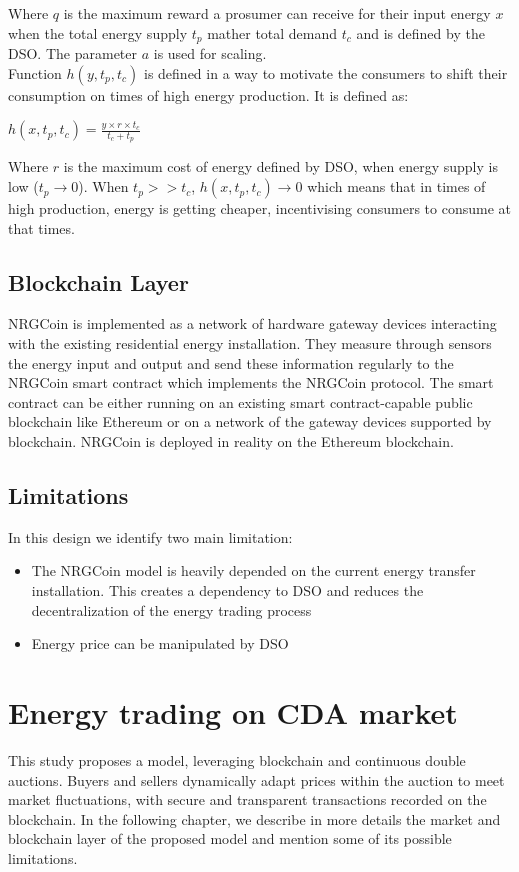 Where $q$ is the maximum reward a prosumer can receive for their input energy $x$ when the total energy supply $t_p$ mather total demand $t_c$ and is defined by the DSO.
The parameter $a$ is used for scaling.\\
Function $h(y,t_p,t_c)$ is defined in a way to motivate the consumers to shift their consumption on times of high energy production. It is defined as:
\begin{center}
    \begin{math}
        h(x,t_p,t_c) = \frac{y \times r \times t_c}{t_c+t_p}
    \end{math}
\end{center}
Where $r$ is the maximum cost of energy defined by DSO, when energy supply is low ($t_p\rightarrow0$).
When $t_p >> t_c$, $h(x,t_p,t_c)\rightarrow0$ which means that in times of high production, energy is getting cheaper, incentivising consumers to consume at that times.

\subsection{Blockchain Layer}

NRGCoin is implemented as a network of hardware gateway devices interacting with the existing residential energy installation. They measure through sensors the energy
input and output and send these information regularly to the NRGCoin smart contract which implements the NRGCoin protocol. The smart contract can be either running on an
existing smart contract-capable public blockchain like Ethereum or on a network of the gateway devices supported by blockchain.
NRGCoin is deployed in reality on the Ethereum blockchain.
\cite{NRGCoin2}

\subsection{Limitations}
In this design we identify two main limitation:
\begin{itemize}
    \item The NRGCoin model is heavily depended on the current energy transfer installation. This creates a dependency to DSO and reduces the decentralization of the energy trading process
    \item Energy price can be manipulated by DSO
\end{itemize}

\section{Energy trading on CDA market}
\label{sec:cda}
This study proposes a model, leveraging blockchain and continuous double auctions. Buyers and sellers dynamically adapt prices within the auction to meet market fluctuations, with secure and 
transparent transactions recorded on the blockchain. In the following chapter, we describe in more details the market and blockchain layer of the proposed model and mention some of its possible 
limitations.

